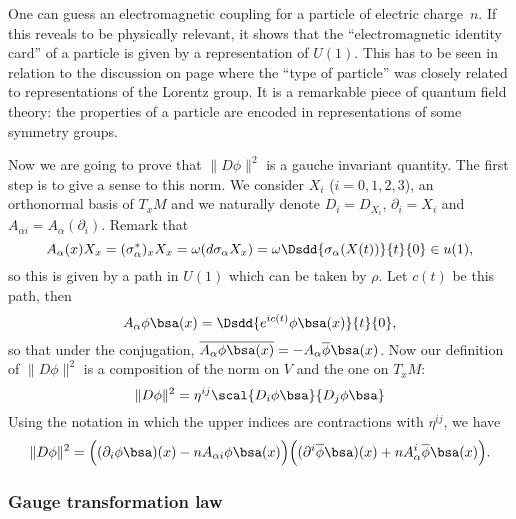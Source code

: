 One can guess an electromagnetic coupling for a particle of electric charge~$n$. If this reveals to be physically relevant, it shows that the ``electromagnetic identity card'' of a particle is given by a representation of $U(1)$. This has to be seen in relation to the discussion on page \pageref{pg:phyz_reprez} where the ``type of particle'' was closely related to representations of the Lorentz group. It is a remarkable piece of quantum field theory: the properties of a particle are encoded in representations of some symmetry groups.

Now we are going to prove that $\|D\phi\|^2$ is a gauche invariant quantity. The first step is to give a sense to this norm. We consider $X_i$ ($i=0,1,2,3$), an orthonormal basis of $T_xM$ and we naturally denote $D_i=D_{X_i}$, $\partial_i=X_i$ and $A_{\alpha i}=A_{\alpha}(\partial_i)$. Remark that 
\begin{equation}
   A_{\alpha}(x)X_x=(\sigma_{\alpha}^*)_xX_x
                 =\omega( d\sigma_{\alpha} X_x )
                 =\omega\Dsdd{ \sigma_{\alpha}(X(t)) }{t}{0}\in u(1),
\end{equation}
so this is given by a path in $U(1)$ which can be taken by $\rho$. Let $c(t)$ be this path, then
\[
   A_{\alpha}\phi\bsa(x)=\Dsdd{ e^{ic(t)}\phi\bsa(x) }{t}{0},
\]
so that under the conjugation, $\overline{A_{\alpha}\phi\bsa(x)}=-A_{\alpha}\overline{ \phi }\bsa(x)$. Now our definition of $\|D\phi\|^2$ is a composition of the norm on $V$ and the one on $T_xM$:
\begin{equation}
  \|D\phi\|^2=\eta^{ij}\scal{ D_i\phi\bsa }{D_j\phi\bsa}
\end{equation}
Using the notation in which the upper indices are contractions with $\eta^{ij}$, we have
\[
\|D\phi\|^2=\Big(  (\partial_i\phi\bsa)(x)-nA_{\alpha i}\phi\bsa(x)   \Big)
            \Big(  (\partial^i\overline{ \phi }\bsa)(x)+nA_{\alpha}^i\overline{ \phi }\bsa(x)   \Big).
\]

\subsubsection{Gauge transformation law}

